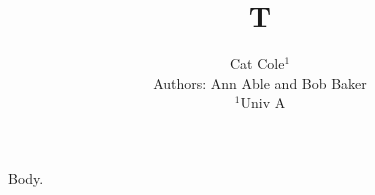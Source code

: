 \documentclass{article}
\begin{document}
\title{T}
\author{Cat Cole$^1$\\ Authors: Ann Able and Bob Baker\\ $^1$Univ A}
\maketitle
Body.
\end{document}
